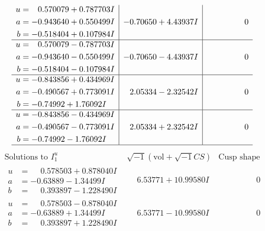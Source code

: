 \documentclass[1p]{elsarticle_modified}
\theoremstyle{definition}
\newcommand{\I}{\sqrt{-1}}
\begin{document}
$$\begin{array}{c|c|c}
\begin{aligned}
u &= \phantom{-}0.570079 + 0.787703 I \\
a &= -0.943640 + 0.550499 I \\
b &= -0.518404 + 0.107984 I\end{aligned}
 & -0.70650 + 4.43937 I & \phantom{-0.000000 } 0 \\ \hline\begin{aligned}
u &= \phantom{-}0.570079 - 0.787703 I \\
a &= -0.943640 - 0.550499 I \\
b &= -0.518404 - 0.107984 I\end{aligned}
 & -0.70650 - 4.43937 I & \phantom{-0.000000 } 0 \\ \hline\begin{aligned}
u &= -0.843856 + 0.434969 I \\
a &= -0.490567 + 0.773091 I \\
b &= -0.74992 + 1.76092 I\end{aligned}
 & \phantom{-}2.05334 - 2.32542 I & \phantom{-0.000000 } 0 \\ \hline\begin{aligned}
u &= -0.843856 - 0.434969 I \\
a &= -0.490567 - 0.773091 I \\
b &= -0.74992 - 1.76092 I\end{aligned}
 & \phantom{-}2.05334 + 2.32542 I & \phantom{-0.000000 } 0\\
 \hline 
 \end{array}$$\newpage$$\begin{array}{c|c|c}  
\text{Solutions to }I^u_{1}& \I (\text{vol} + \sqrt{-1}CS) & \text{Cusp shape}\\
 \hline 
\begin{aligned}
u &= \phantom{-}0.578503 + 0.878040 I \\
a &= -0.63889 - 1.34499 I \\
b &= \phantom{-}0.393897 - 1.228490 I\end{aligned}
 & \phantom{-}6.53771 + 10.99580 I & \phantom{-0.000000 } 0 \\ \hline\begin{aligned}
u &= \phantom{-}0.578503 - 0.878040 I \\
a &= -0.63889 + 1.34499 I \\
b &= \phantom{-}0.393897 + 1.228490 I\end{aligned}
 & \phantom{-}6.53771 - 10.99580 I & \phantom{-0.000000 } 0 \\ \hline\begin{aligned}

\end{aligned}
\end{array}$$
\end{document}
